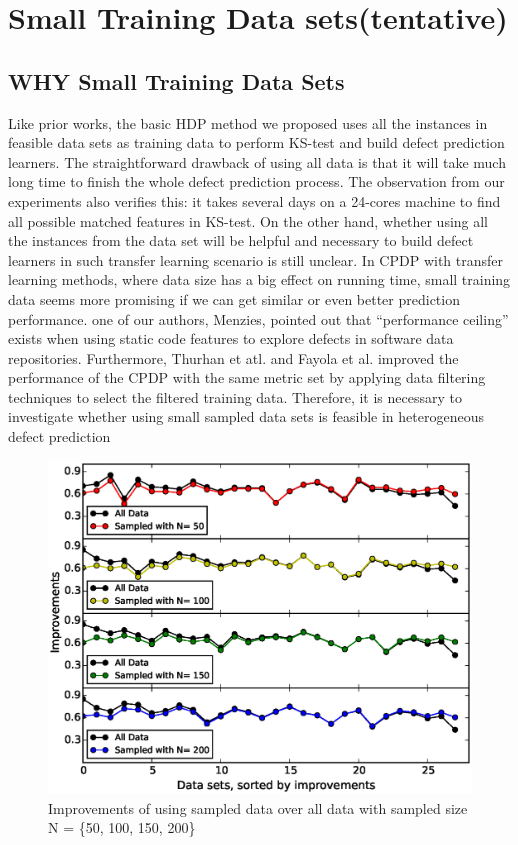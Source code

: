 \section{Small Training Data sets(tentative)}
\label{sec: small_data_sets}

\subsection{WHY Small Training Data Sets}
Like prior works\cite{nam2013transfer,ma2012transfer,rahman2012recalling,ryu2014value,zhang2014towards}, the basic HDP method we proposed uses all the instances in feasible data sets as training data to perform KS-test and build defect prediction learners. The straightforward drawback of using all data is that it will take much long time to finish the whole defect prediction process. The observation from our experiments also verifies this: it takes several days on a 24-cores machine to find all possible matched features in KS-test. On the other hand, whether using all the instances from the data set will be helpful and necessary to build defect learners in such transfer learning scenario is still unclear. In CPDP with transfer learning methods, where data size has a big effect on running time, small training data seems more promising if we can get similar or even better prediction performance. one of our authors, Menzies, pointed out that ``performance ceiling'' exists when using static code features to explore defects in software data repositories\cite{menzies2008implications}.  Furthermore, Thurhan et atl.\cite{turhan2009relative} and Fayola et al.\cite{peters2013better} improved the  performance of the CPDP with the same metric set by applying data filtering techniques to select the filtered training data. Therefore, it is necessary to investigate whether using small sampled data sets is feasible in heterogeneous defect prediction

\begin{figure}[!htp]
	\centering
	\includegraphics[width=\linewidth]{Figures/raleigh/sampled.eps}
	\caption{Improvements of using sampled data over all data with sampled size N = \{50, 100, 150, 200\}}
	\label{fig:small_data}
\end{figure}

